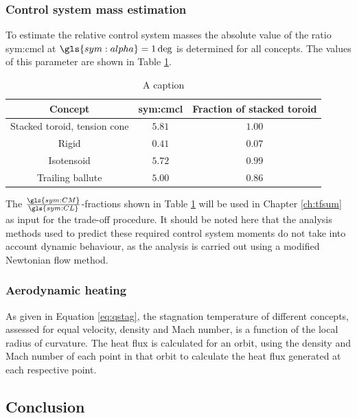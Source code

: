 \subsubsection{Control system mass estimation}
To estimate the relative control system masses the absolute value of the ratio \gls{sym:cmcl} at $\gls{sym:alpha}=1\deg$ is determined for all concepts. The values of this parameter are shown in Table \ref{tab:controlmass}. %

\begin{table}[h]
	\centering
	\caption{A caption}
	\begin{tabular}{|c|c|c|}
		\hline
		\textbf{Concept} & \textbf{\gls{sym:cmcl}} & \textbf{Fraction of stacked toroid} \\ \hline \hline
		Stacked toroid, tension cone & $5.81$ & $1.00$\\
		Rigid & $0.41$ & $0.07$\\
		Isotensoid & $5.72$ & $0.99$\\
		Trailing ballute & $5.00$ & $0.86$\\
		\hline
	\end{tabular}
	\label{tab:controlmass}
\end{table}

The $\frac{\gls{sym:CM}}{\gls{sym:CL}}$-fractions shown in Table \ref{tab:controlmass} will be used in Chapter \ref{ch:tfsum} as input for the trade-off procedure. It should be noted here that the analysis methods used to predict these required control system moments do not take into account dynamic behaviour, as the analysis is carried out using a modified Newtonian flow method.

\subsubsection{Aerodynamic heating}
As given in Equation \ref{eq:qstag}, the stagnation temperature of different concepts, assessed for equal velocity, density and Mach number, is a function of the local radius of curvature. The heat flux is calculated for an orbit, using the density and Mach number of each point in that orbit to calculate the heat flux generated at each respective point.



\subsection{Conclusion}

